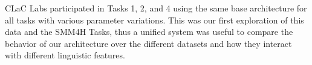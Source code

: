 CLaC Labs participated in Tasks 1, 2, and 4 using the same base architecture for all tasks with various parameter variations. This was our first exploration of this data and the SMM4H Tasks, thus a unified system was useful to compare the behavior of our architecture over the different datasets and how they interact with different linguistic features.
